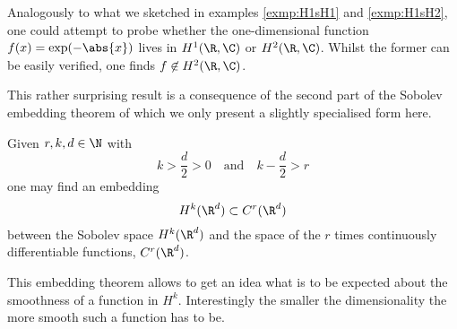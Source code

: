 \begin{rem}
	Analogously to what we sketched in examples \vref{exmp:H1sH1} and \vref{exmp:H1sH2},
	one could attempt to probe whether the one-dimensional function
	$f(x) = \exp(-\abs{x})$ lives in $H^1(\R,\C)$ or $H^2(\R,\C)$.
	Whilst the former can be easily verified,
	one finds $f \not\in H^2(\R,\C)$.
\end{rem}

This rather surprising result is a consequence of the second part of
the Sobolev embedding theorem
of which we only present a slightly specialised form here.
\begin{thm}
	Given $r, k, d \in \N$ with
	\[ k > \frac{d}{2} > 0 \quad \text{and} \quad k -\frac{d}{2} > r \]
	one may find an embedding
	\[ H^k(\R^d) \subset C^r(\R^d) \]
	between the Sobolev space $H^k(\R^d)$ and the space of the $r$ times
	continuously differentiable functions, $C^r(\R^d)$.
\end{thm}
This embedding theorem allows to get an idea what is to be expected about
the smoothness of a function in $H^k$.
Interestingly the smaller the dimensionality the more smooth such a function
has to be.

%
%
